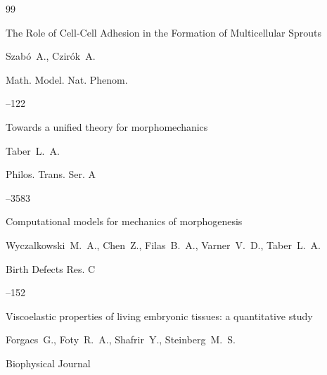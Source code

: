 \begin{thebibliography}{99}
 


\paper The Role of Cell-Cell Adhesion in the Formation of Multicellular Sprouts

\by   Szab\'o~A.,  Czir\'ok~A.

\jour   Math. Model. Nat. Phenom.




--122


 

 


\paper Towards a unified theory for morphomechanics

\by   Taber~L.~A.

\jour   Philos. Trans. Ser. A




--3583


 


\paper Computational models for mechanics of morphogenesis

\by   Wyczalkowski~M.~A., Chen~Z., Filas~B.~A.,  Varner~V.~D., Taber~L.~A.

\jour   Birth Defects Res. C




--152 


 


\paper Viscoelastic properties of living embryonic tissues: a quantitative study

\by   Forgacs~G., Foty~R.~A., Shafrir~Y.,  Steinberg~M.~S.

\jour Biophysical  Journal





\end{thebibliography}
